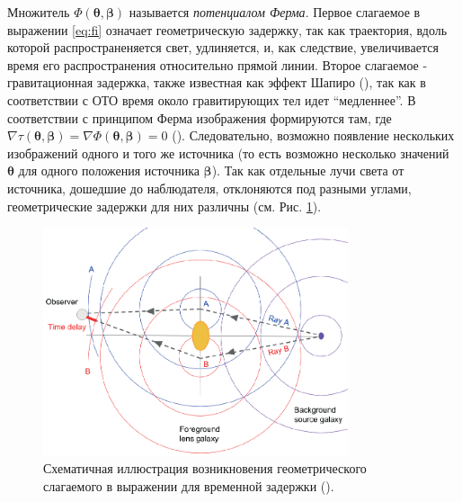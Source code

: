 Множитель $\Phi(\boldsymbol{\theta},\boldsymbol{\beta})$ называется \textit{потенциалом Ферма}. Первое слагаемое в выражении \eqref{eq:fi} означает геометрическую задержку, так как траектория, вдоль которой распространеняется свет, удлиняется, и, как следствие, увеличивается время его распространения относительно прямой линии. Второе слагаемое - гравитационная задержка, также известная как эффект Шапиро (\cite{shapiro1964}), так как в соответствии с ОТО время около гравитирующих тел идет “медленнее”. В соответствии с принципом Ферма изображения формируются там, где $\nabla \tau(\boldsymbol{\theta}, \boldsymbol{\beta}) = \nabla \Phi(\boldsymbol{\theta}, \boldsymbol{\beta}) = 0 $ (\cite{schneider1985}). 
Следовательно, возможно появление нескольких изображений  одного и того же источника (то есть возможно несколько значений $\boldsymbol{\theta}$ для одного положения источника $\boldsymbol{\beta}$). Так как отдельные лучи света от источника, дошедшие до наблюдателя, отклоняются под разными углами, геометрические задержки для них различны (см. Рис. \ref{fig:timedelayorigin}). 



\begin{figure}[h]
    \centering
	\includegraphics[width=0.80\textwidth]{pics/timedelayorigin.eps}
	\caption{Схематичная иллюстрация возникновения геометрического слагаемого в выражении для временной задержки (\cite{timedelaycosmography}).}
	\label{fig:timedelayorigin}
\end{figure} 

